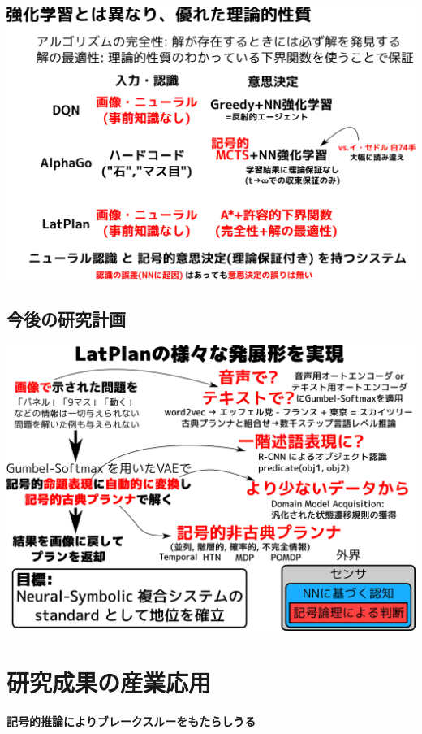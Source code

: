 \includegraphics{img/keps17-3.png}


\subsection{今後の研究計画}
\label{sec-2-5}

\begin{resume}

\end{resume}

\includegraphics{img/keps17-4.png}

\section{研究成果の産業応用}
\label{sec-3}

\begin{center}
\textbf{記号的推論によりブレークスルーをもたらしうる}
\end{center}


